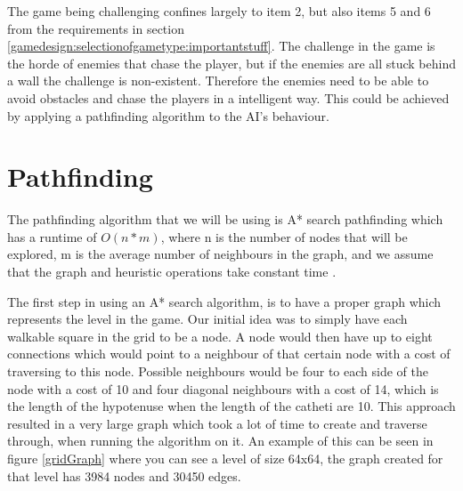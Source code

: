 The game being challenging confines largely to item 2, but also items 5 and 6 from the requirements in section \ref{gamedesign:selectionofgametype:importantstuff}.
The challenge in the game is the horde of enemies that chase the player, but if the enemies are all stuck behind a wall the challenge is non-existent.
Therefore the enemies need to be able to avoid obstacles and chase the players in a intelligent way.
This could be achieved by applying a pathfinding algorithm to the AI's behaviour.

\section{Pathfinding}

The pathfinding algorithm that we will be using is A* search pathfinding which has a runtime of $O(n*m)$, where n is the number of nodes that will be explored, m is the average number of neighbours in the graph, and we assume that the graph and heuristic operations take constant time \cite{AIG:Millington}.

The first step in using an A* search algorithm, is to have a proper graph which represents the level in the game.
Our initial idea was to simply have each walkable square in the grid to be a node.
A node would then have up to eight connections which would point to a neighbour of that certain node with a cost of traversing to this node.
Possible neighbours would be four to each side of the node with a cost of 10 and four diagonal neighbours with a cost of 14, which is the length of the hypotenuse when the length of the catheti are 10.
This approach resulted in a very large graph which took a lot of time to create and traverse through, when running the algorithm on it.
An example of this can be seen in figure \ref{gridGraph} where you can see a level of size 64x64, the graph created for that level has 3984 nodes and 30450 edges.


